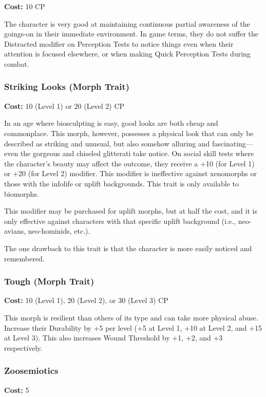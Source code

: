 \textbf{Cost:} 10 CP

The character is very good at maintaining continuous
partial awareness of the goings-on in their
immediate environment. In game terms, they do not 
suffer the Distracted modifier on Perception Tests 
to notice things even when their attention is focused 
elsewhere, or when making Quick Perception Tests 
during combat.

\subsubsection{Striking Looks (Morph Trait)}

\textbf{Cost:} 10 (Level 1) or 20 (Level 2) CP

In an age where biosculpting is easy, good looks are 
both cheap and commonplace. This morph, however, 
possesses a physical look that can only be described as 
striking and unusual, but also somehow alluring and 
fascinating—even the gorgeous and chiseled glitterati 
take notice. On social skill tests where the character's 
beauty may affect the outcome, they receive a +10 (for 
Level 1) or +20 (for Level 2) modifier. This modifier 
is ineffective against xenomorphs or those with the 
infolife or uplift backgrounds. This trait is only available
to biomorphs.

This modifier may be purchased for uplift morphs, 
but at half the cost, and it is only effective against 
characters with that specific uplift background (i.e., 
neo-avians, neo-hominids, etc.).

The one drawback to this trait is that the character 
is more easily noticed and remembered.

\subsubsection{Tough (Morph Trait)}

\textbf{Cost:} 10 (Level 1), 20 (Level 2), or 30 (Level 3) CP

This morph is resilient than others of its type and 
can take more physical abuse. Increase their Durability
by +5 per level (+5 at Level 1, +10 at Level 2, and
+15 at Level 3). This also increases Wound Threshold 
by +1, +2, and +3 respectively.

\subsubsection{Zoosemiotics}

\textbf{Cost:} 5

